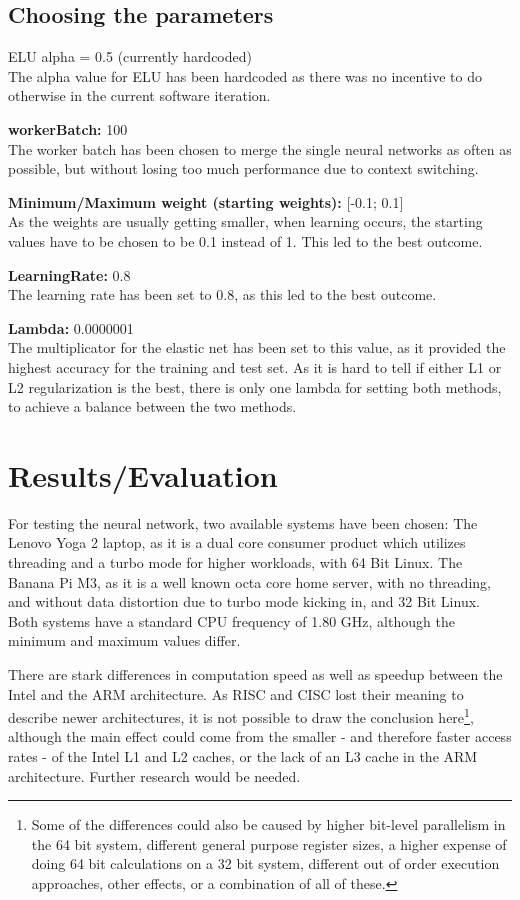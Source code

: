 \documentclass[11pt]{article}
\begin{document}
\subsection{Choosing the parameters}
ELU alpha = 0.5 (currently hardcoded)\\
The alpha value for ELU has been hardcoded as there was no incentive to do otherwise in the current software iteration.

\textbf{workerBatch:} 100\\
The worker batch has been chosen to merge the single neural networks as often as possible, but without losing too much performance due to context switching.

\textbf{Minimum/Maximum weight (starting weights):} [-0.1; 0.1]\\
As the weights are usually getting smaller, when learning occurs, the starting values have to be chosen to be 0.1 instead of 1. This led to the best outcome.

\textbf{LearningRate:} 0.8\\
The learning rate has been set to 0.8, as this led to the best outcome.

\textbf{Lambda:} 0.0000001\\
The multiplicator for the elastic net has been set to this value, as it provided the highest accuracy for the training and test set. As it is hard to tell if either L1 or L2 regularization is the best, there is only one lambda for setting both methods, to achieve a balance between the two methods.

\section{Results/Evaluation}
For testing the neural network, two available systems have been chosen: The Lenovo Yoga 2 laptop, as it is a dual core consumer product which utilizes threading and a turbo mode for higher workloads, with 64 Bit Linux. The Banana Pi M3, as it is a well known octa core home server, with no threading, and without data distortion due to turbo mode kicking in, and 32 Bit Linux. Both systems have a standard CPU frequency of 1.80 GHz, although the minimum and maximum values differ.

There are stark differences in computation speed as well as speedup between the Intel and the ARM architecture. As RISC and CISC lost their meaning to describe newer architectures, it is not possible to draw the conclusion here\footnote{Some of the differences could also be caused by higher bit-level parallelism in the 64 bit system, different general purpose register sizes, a higher expense of doing 64 bit calculations on a 32 bit system, different out of order execution approaches, other effects, or a combination of all of these.}, although the main effect could come from the smaller - and therefore faster access rates - of the Intel L1 and L2 caches, or the lack of an L3 cache in the ARM architecture. Further research would be needed.
\end{document}
